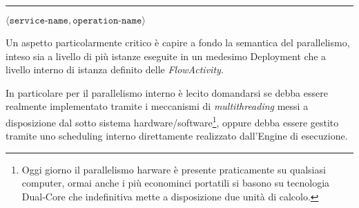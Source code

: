 \rule{7cm}{0.01cm}

$\langle \texttt{service-name}, \texttt{operation-name} \rangle$





Un aspetto particolarmente critico è capire a fondo la semantica del
parallelismo, inteso sia a livello di più istanze eseguite in un medesimo Deployment che a
livello interno di istanza definito delle \emph{FlowActivity}. 

In particolare per il parallelismo interno è lecito domandarsi se debba essere
realmente implementato tramite i meccanismi di \emph{multithreading} messi a
disposizione dal sotto sistema hardware/software\footnote{Oggi giorno il
parallelismo harware è presente praticamente su qualsiasi computer, ormai anche i
più econominci portatili si basono su tecnologia Dual-Core che indefinitiva mette
a disposizione due unità di calcolo.}, oppure debba essere gestito tramite uno
scheduling interno direttamente realizzato dall'Engine di esecuzione.

